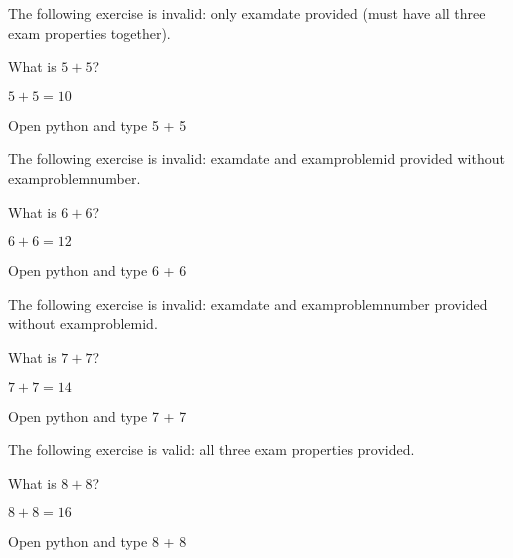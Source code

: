 \documentclass{book}
\begin{document}
The following exercise is invalid: only examdate provided (must have all three exam properties together).

\begin{exercise}[examdate={January 15, 2020}]
  What is \(5 + 5\)?
\end{exercise}
\begin{solution}
  \(5 + 5 = 10\)
\end{solution}
\begin{additionalinformation}
Open python and type 5 + 5
\end{additionalinformation}

The following exercise is invalid: examdate and examproblemid provided without examproblemnumber.

\begin{exercise}[examdate={January 15, 2020}, examproblemid={2020-01-15-06}]
  What is \(6 + 6\)?
\end{exercise}
\begin{solution}
  \(6 + 6 = 12\)
\end{solution}
\begin{additionalinformation}
Open python and type 6 + 6
\end{additionalinformation}

The following exercise is invalid: examdate and examproblemnumber provided without examproblemid.

\begin{exercise}[examdate={January 15, 2020}, examproblemnumber={7}]
  What is \(7 + 7\)?
\end{exercise}
\begin{solution}
  \(7 + 7 = 14\)
\end{solution}
\begin{additionalinformation}
Open python and type 7 + 7
\end{additionalinformation}

The following exercise is valid: all three exam properties provided.

\begin{exercise}[examdate={January 15, 2020}, examproblemnumber={8}, examproblemid={2020-01-15-08}]
  What is \(8 + 8\)?
\end{exercise}
\begin{solution}
  \(8 + 8 = 16\)
\end{solution}
\begin{additionalinformation}
Open python and type 8 + 8
\end{additionalinformation}
\end{document}
